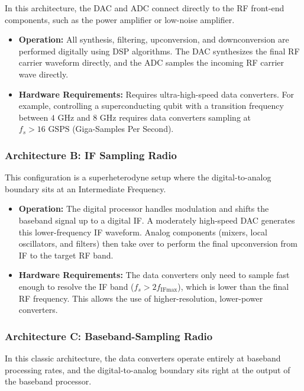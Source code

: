 \documentclass[
]{article}
\providecommand{\tightlist}{%
  \setlength{\itemsep}{0pt}\setlength{\parskip}{0pt}}
\begin{document}
In this architecture, the DAC and ADC connect directly to the RF
front-end components, such as the power amplifier or low-noise
amplifier.

\begin{itemize}
\tightlist
\item
  \textbf{Operation:} All synthesis, filtering, upconversion, and
  downconversion are performed digitally using DSP algorithms. The DAC
  synthesizes the final RF carrier waveform directly, and the ADC
  samples the incoming RF carrier wave directly.
\item
  \textbf{Hardware Requirements:} Requires ultra-high-speed data
  converters. For example, controlling a superconducting qubit with a
  transition frequency between \(4\text{ GHz}\) and \(8\text{ GHz}\)
  requires data converters sampling at \(f_s > 16\text{ GSPS}\)
  (Giga-Samples Per Second).
\end{itemize}

\subsubsection{Architecture B: IF Sampling
Radio}\label{architecture-b-if-sampling-radio}

This configuration is a superheterodyne setup where the
digital-to-analog boundary sits at an Intermediate Frequency.

\begin{itemize}
\tightlist
\item
  \textbf{Operation:} The digital processor handles modulation and
  shifts the baseband signal up to a digital IF. A moderately high-speed
  DAC generates this lower-frequency IF waveform. Analog components
  (mixers, local oscillators, and filters) then take over to perform the
  final upconversion from IF to the target RF band.
\item
  \textbf{Hardware Requirements:} The data converters only need to
  sample fast enough to resolve the IF band
  (\(f_s > 2f_{\text{IFmax}}\)), which is lower than the final RF
  frequency. This allows the use of higher-resolution, lower-power
  converters.
\end{itemize}

\subsubsection{Architecture C: Baseband-Sampling
Radio}\label{architecture-c-baseband-sampling-radio}

In this classic architecture, the data converters operate entirely at
baseband processing rates, and the digital-to-analog boundary sits right
at the output of the baseband processor.
\end{document}
